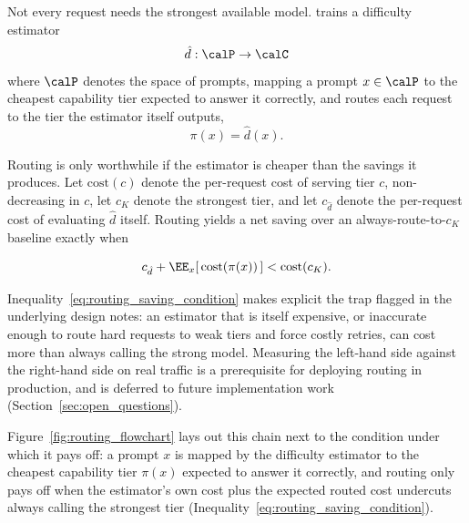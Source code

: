 Not every request needs the strongest available model. \NoesisServer{}
trains a difficulty estimator
\begin{equation}
  \label{eq:difficulty_estimator}
  \hat d : \calP \to \calC
\end{equation}
where $\calP$ denotes the space of prompts, mapping a prompt $x \in \calP$
to the cheapest capability tier expected to
answer it correctly, and routes each request to the tier the estimator
itself outputs,
\begin{equation}
  \label{eq:routing_policy}
  \pi(x) = \hat d(x).
\end{equation}

Routing is only worthwhile if the estimator is cheaper than the savings it
produces. Let $\text{cost}(c)$ denote the per-request cost of serving tier
$c$, non-decreasing in $c$, let $c_K$ denote the strongest tier, and let
$c_{\hat d}$ denote the per-request cost of evaluating $\hat d$ itself.
Routing yields a net saving over an always-route-to-$c_K$ baseline exactly
when

\begin{equation}
  \label{eq:routing_saving_condition}
  c_{\hat d} + \EE_x [\, \text{cost}(\pi(x)) \,]
  <
  \text{cost}(c_K).
\end{equation}

Inequality~\eqref{eq:routing_saving_condition} makes explicit the trap
flagged in the underlying design notes: an estimator that is itself
expensive, or inaccurate enough to route hard requests to weak tiers and
force costly retries, can cost more than always calling the strong model.
Measuring the left-hand side against the right-hand side on real traffic
is a prerequisite for deploying routing in production, and is deferred to
future implementation work (Section~\ref{sec:open_questions}).

Figure~\ref{fig:routing_flowchart} lays out this chain next to the
condition under which it pays off: a prompt $x$ is mapped by the
difficulty estimator to the cheapest capability tier $\pi(x)$ expected to
answer it correctly, and routing only pays off when the estimator's own
cost plus the expected routed cost undercuts always calling the strongest
tier (Inequality~\eqref{eq:routing_saving_condition}).

